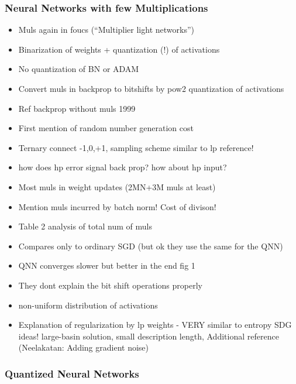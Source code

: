 \documentclass{article}
\begin{document}
\subsubsection*{Neural Networks with few Multiplications}
    \begin{itemize}
    \item Muls again in foucs (``Multiplier light networks'')
    \item Binarization of weights + quantization (!) of activations
    \item No quantization of BN or ADAM
    \item Convert muls in backprop to bitshifts by pow2 quantization of activations
    \item Ref backprop without muls 1999
    \item First mention of random number generation cost
    \item Ternary connect -1,0,+1, sampling scheme similar to lp reference!
    \item how does hp error signal back prop? how about hp input?
    \item Most muls in weight updates (2MN+3M muls at least)
    \item Mention muls incurred by batch norm! Cost of divison!
    \item Table 2 analysis of total num of muls
    \item Compares only to ordinary SGD (but ok they use the same for the QNN)
    \item QNN converges slower but better in the end fig 1
    \item They dont explain the bit shift operations properly
    \item non-uniform distribution of activations
    \item Explanation of regularization by lp weights - VERY similar to entropy
    SDG ideas! large-basin solution, small description length, Additional reference
    (Neelakatan: Adding gradient noise)
    \end{itemize}

\subsubsection*{Quantized Neural Networks}
\end{document}
